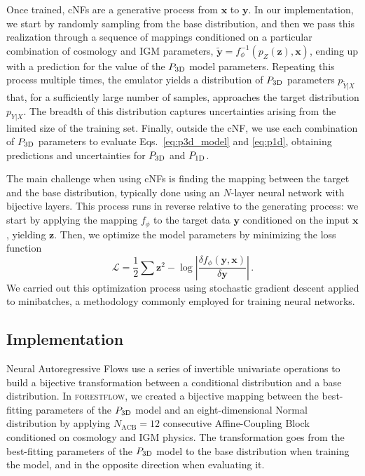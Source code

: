 \documentclass[longauth]{aa}
\newcommand{\poned}{\ensuremath{P_{\rm 1D}}\xspace}
\newcommand{\pthreed}{\ensuremath{P_{\rm 3D}}\xspace}
\newcommand{\forestflow}{\textsc{forestflow}\xspace}
\begin{document}
Once trained, cNFs are a generative process from $\mathbf{x}$ to $\mathbf{y}$. In our implementation, we start by randomly sampling from the base distribution, and then we pass this realization through a sequence of mappings conditioned on a particular combination of cosmology and IGM parameters, $\mathbf{\tilde{y}}=f_\phi^{-1}(p_{Z}(\mathbf{z}), \mathbf{x})$, ending up with a prediction for the value of the \pthreed model parameters. Repeating this process multiple times, the emulator yields a distribution of \pthreed parameters $p_{\tilde{Y}|X}$ that, for a sufficiently large number of samples, approaches the target distribution $p_{Y|X}$. The breadth of this distribution captures uncertainties arising from the limited size of the training set. Finally, outside the cNF, we use each combination of \pthreed parameters to evaluate Eqs.~\ref{eq:p3d_model} and \ref{eq:p1d}, obtaining predictions and uncertainties for \pthreed and \poned.

The main challenge when using cNFs is finding the mapping between the target and the base distribution, typically done using an $N$-layer neural network with bijective layers. This process runs in reverse relative to the generating process: we start by applying the mapping $f_\phi$ to the target data $\mathbf{y}$ conditioned on the input $\mathbf{x}$, yielding $\mathbf{z}$. Then, we optimize the model parameters by minimizing the loss function
%
\begin{equation}
    \mathcal{L} = \frac{1}{2} \sum \textbf{z}^2 - \log \left|\frac{\delta f_\phi(\mathbf{y}, \mathbf{x})}{\delta \mathbf{y}}\right|\,.
    \label{eq:loss} 
\end{equation}
%
We carried out this optimization process using stochastic gradient descent applied to minibatches, a methodology commonly employed for training neural networks.



\subsection{Implementation}
\label{sec:forestflow_implementation}

Neural Autoregressive Flows \citep{NAF} use a series of invertible univariate operations to build a bijective transformation between a conditional distribution and a base distribution. In \forestflow, we created a bijective mapping between the best-fitting parameters of the \pthreed model and an eight-dimensional Normal distribution by applying $N_\mathrm{ACB}=12$ consecutive Affine-Coupling Block \citep[ACB;][]{RealNVP} conditioned on cosmology and IGM physics. The transformation goes from the best-fitting parameters of the \pthreed model to the base distribution when training the model, and in the opposite direction when evaluating it.
\end{document}
